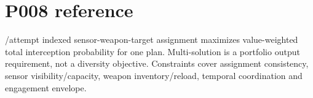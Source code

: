 \section*{P008 reference}\nTime/attempt indexed sensor-weapon-target assignment maximizes value-weighted total interception probability for one plan. Multi-solution is a portfolio output requirement, not a diversity objective. Constraints cover assignment consistency, sensor visibility/capacity, weapon inventory/reload, temporal coordination and engagement envelope.\n